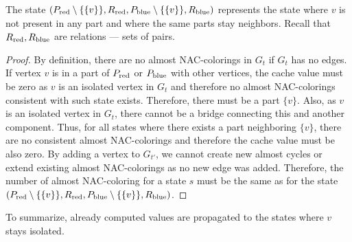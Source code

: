 %
The state \( (P_{\text{red}} \setminus \{\{v\}\}, R_{\text{red}}, P_{\text{blue}} \setminus \{\{v\}\}, R_{\text{blue}}) \)
represents the state where \( v \) is not present in any part
and where the same parts stay neighbors.
Recall that \( R_{\text{red}}, R_{\text{blue}} \) are relations --- sets of pairs.
%
\begin{proof}
	By definition, there are no almost NAC-colorings
	in \( G_t \) if \( G_t \) has no edges.
	If vertex \( v \) is in a part of \( P_{\text{red}} \) or \( P_{\text{blue}} \) with other vertices,
	the cache value must be zero as \( v \) is an isolated vertex in \( G_t \)
	and therefore no almost NAC-colorings consistent with such state exists.
	Therefore, there must be a part \( \{v\} \).
	Also, as \( v \) is an isolated vertex in \( G_t \), there cannot be a bridge
	connecting this and another component.
	Thus, for all states where there exists
	a part neighboring \( \{v\} \), there are no consistent almost NAC-colorings
	and therefore the cache value must be also zero.
	By adding a vertex to \( G_{t'} \), we cannot create new almost cycles
	or extend existing almost NAC-colorings as no new edge was added.
	Therefore, the number of almost NAC-coloring for a state \( s \) must be the same
	as for the state \( (P_{\text{red}} \setminus \{\{v\}\}, R_{\text{red}}, P_{\text{blue}} \setminus \{\{v\}\}, R_{\text{blue}}) \).
\end{proof}
%
To summarize, already computed values are propagated to the states
where \( v \) stays isolated.

